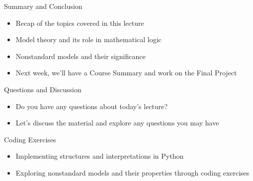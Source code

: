 \documentclass[presentation]{beamer}
\begin{document}
\begin{frame}[label={sec:org12e7668}]{Summary and Conclusion}
\begin{itemize}
\item Recap of the topics covered in this lecture
\item Model theory and its role in mathematical logic
\item Nonstandard models and their significance
\item Next week, we'll have a Course Summary and work on the Final Project
\end{itemize}
\end{frame}

\begin{frame}[label={sec:org6c16af8}]{Questions and Discussion}
\begin{itemize}
\item Do you have any questions about today's lecture?
\item Let's discuss the material and explore any questions you may have
\end{itemize}
\end{frame}

\begin{frame}[label={sec:org4ecc027}]{Coding Exercises}
\begin{itemize}
\item Implementing structures and interpretations in Python
\item Exploring nonstandard models and their properties through coding exercises
\end{itemize}
\end{frame}
\end{document}
